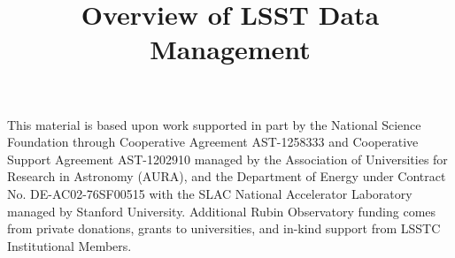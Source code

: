 \documentclass[twocolumn]{aastex631}
\begin{document}

\title{Overview of LSST Data Management}






\begin{acknowledgments}
This material is based upon work supported in part by the National Science Foundation through Cooperative Agreement AST-1258333 and Cooperative Support Agreement AST-1202910 managed by the Association of Universities for Research in Astronomy (AURA), and the Department of Energy under Contract No. DE-AC02-76SF00515 with the SLAC National Accelerator Laboratory managed by Stanford University.
Additional Rubin Observatory funding comes from private donations, grants to universities, and in-kind support from LSSTC Institutional Members.
\end{acknowledgments}


\label{sec:bib}

\end{document}

